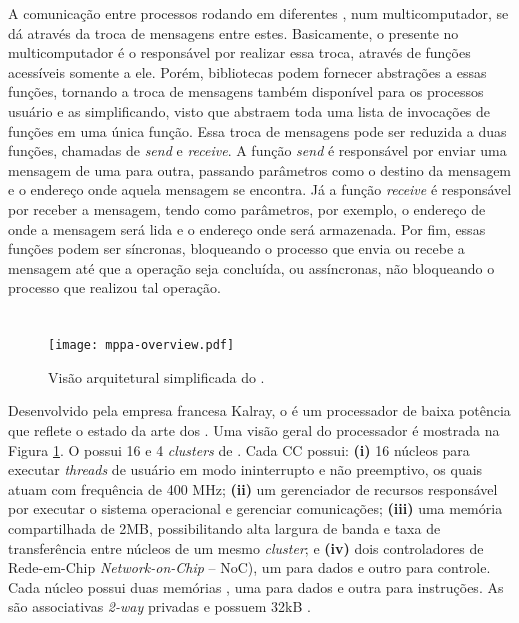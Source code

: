 A comunicação entre processos rodando em diferentes \CPUs, num multicomputador, se dá através da troca de mensagens entre estes. Basicamente, o \SO presente no multicomputador é o responsável por realizar essa troca, através de funções acessíveis somente a ele. Porém, bibliotecas podem fornecer abstrações a essas funções, tornando a troca de mensagens também disponível para os processos usuário e as simplificando, visto que abstraem toda uma lista de invocações de funções em uma única função. Essa troca de mensagens pode ser reduzida a duas funções, chamadas de \textit{send} e \textit{receive}. A função \textit{send} é responsável por enviar uma mensagem de uma \CPU para outra, passando parâmetros como o destino da mensagem e o endereço onde aquela mensagem se encontra. Já a função \textit{receive} é responsável por receber a mensagem, tendo como parâmetros, por exemplo, o endereço de onde a mensagem será lida e o endereço onde será armazenada. Por fim, essas funções podem ser síncronas, bloqueando o processo que envia ou recebe a mensagem até que a operação seja concluída, ou assíncronas, não bloqueando o processo que realizou tal operação.

\section{\mppa}
\label{sec:mppa256}

\begin{figure}[tb]
  \centering
  \caption{Visão arquitetural simplificada do \mppa.}
  \label{fig:mppa256overview}
  \texttt{[image: mppa-overview.pdf]}
\end{figure}

Desenvolvido pela empresa francesa Kalray, o \mppa é um processador de baixa potência que reflete o estado da arte dos \manycore. Uma visão geral do processador é mostrada na Figura \ref{fig:mppa256overview}. O \mppa possui 16 \CCs e 4 \textit{clusters} de \IO. Cada CC possui: \textbf{(i)} 16 núcleos para executar \textit{threads} de usuário em modo ininterrupto e não preemptivo, os quais atuam com frequência de 400 MHz; \textbf{(ii)} um gerenciador de recursos responsável por executar
o sistema operacional e gerenciar comunicações; \textbf{(iii)} uma memória compartilhada de 2MB, possibilitando alta largura de banda e taxa de transferência entre núcleos de um mesmo \textit{cluster}; e  \textbf{(iv)} dois controladores de Rede-em-Chip \textit{Network-on-Chip} -- NoC), um para dados e outro para controle. Cada núcleo possui duas memórias \cache, uma para dados e outra para instruções. As \caches são associativas \textit{2-way} privadas e possuem 32kB \cite{Podesta2018Stencil}.

